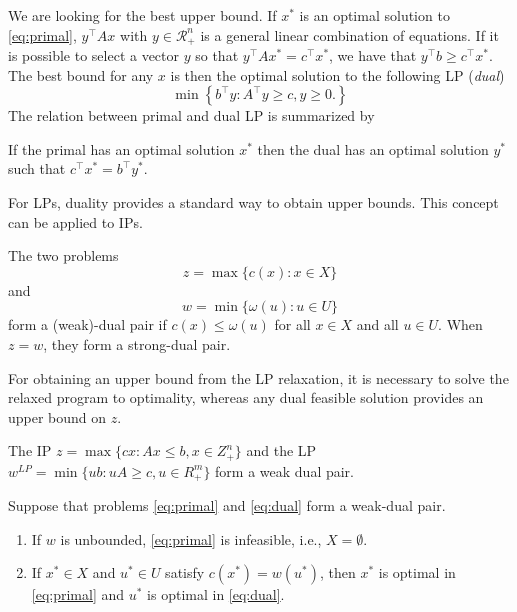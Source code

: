 We are looking for the best upper bound. 
If $x^*$ is an optimal solution to \eqref{eq:primal}, $y^\top Ax$ with $y\in \mathcal{R}^n_+$ is a general linear combination of equations.
If it is possible to select a vector $y$ so that $y^\top Ax^*=c^\top x^*$, we have that $y^\top b \geq c^\top x^*$.
The best bound for any $x$ is then the optimal solution to the following LP (\emph{dual})
\begin{equation}
	\min \left\{b^\top y :  A^\top y \geq c, y   \geq 0.\right\} 
\label{eq:dual}
\end{equation}
The relation between primal and dual LP is summarized by
\begin{proposition}
If the primal has an optimal solution $x^*$ then the dual has an optimal solution $y^*$ such that $c^\top x^* = b^\top y^*$.
\end{proposition}
For LPs, duality provides a standard way to obtain upper bounds.
This concept can be applied to IPs.
\begin{definition}\cite{wolsey98}
The two problems
\begin{equation}\label{eq:primal}
	z=\max\{c(x): x\in X\}
\end{equation}
and
\begin{equation}\label{eq:dual}
	w=\min\{\omega(u): u\in U\}
\end{equation}
form a (weak)-dual pair if $c(x)\leq \omega(u)$ for all $x\in X$ and all $u\in U$. 
When $z=w$, they form a strong-dual pair.
\end{definition}
For obtaining an upper bound from the LP relaxation, it is necessary to solve the relaxed program to optimality, whereas any dual feasible solution provides an upper bound on $z$.
\begin{proposition}\cite{wolsey98}
The IP $z=\max\{cx: Ax\leq b, x\in Z^n_+\}$ and the LP $w^{LP}=\min\{ub:uA\geq c, u\in R^m_+\}$ form a weak dual pair.
\end{proposition}
\begin{proposition}\cite{wolsey98}
Suppose that problems \eqref{eq:primal} and \eqref{eq:dual} form a weak-dual pair.
\begin{enumerate}
	\item If $w$ is unbounded, \eqref{eq:primal} is infeasible, i.e., $X=\emptyset$.
	\item If $x^*\in X$ and $u^*\in U$ satisfy $c(x^*)=w(u^*)$, then $x^*$ is optimal in \eqref{eq:primal} and $u^*$ is optimal in \eqref{eq:dual}.
\end{enumerate}
\end{proposition}

